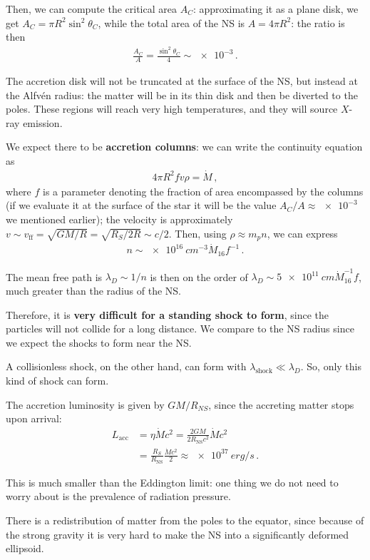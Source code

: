 \documentclass[main.tex]{subfiles}
\begin{document}
Then, we can compute the critical area \(A_C\): approximating it as a plane disk, we get \(A_C = \pi R^2 \sin^2 \theta _C\), while the total area of the NS is \(A = 4 \pi R^2\): the ratio is then 
%
\begin{align}
\frac{A_C}{A} = \frac{\sin^2 \theta _C}{4} \sim \num{e-3}
\,.
\end{align}

The accretion disk will not be truncated at the surface of the NS, but instead at the Alfvén radius: the matter will be in its thin disk and then be diverted to the poles. 
These regions will reach very high temperatures, and they will source \(X\)-ray emission.

We expect there to be \textbf{accretion columns}: we can write the continuity equation as 
%
\begin{align}
4 \pi R^2 f v \rho = \dot{M}
\,,
\end{align}
%
where \(f\) is a parameter denoting the fraction of area encompassed by the columns (if we evaluate it at the surface of the star it will be the value \(A_C / A \approx \num{e-3}\) we mentioned earlier); the velocity is approximately \(v \sim v _{\text{ff}} = \sqrt{GM/R} = \sqrt{R_S / 2R} \sim c/2\). 
Then, using \(\rho \approx m_p n\), we can express 
%
\begin{align}
n \sim \SI{e16}{cm^{-3}} \dot{M}_{16} f^{-1}
\,.
\end{align}

The mean free path is \(\lambda _D \sim 1/n\) is then on the order of \(\lambda _D \sim \SI{5e11}{cm} \dot{M}_{16}^{-1} f\), much greater than the radius of the NS. 

Therefore, it is \textbf{very difficult for a standing shock to form}, since the particles will not collide for a long distance. 
We compare to the NS radius since we expect the shocks to form near the NS. 

A collisionless shock, on the other hand, can form with \(\lambda _{\text{shock}} \ll \lambda _D\). 
So, only this kind of shock can form. 

The accretion luminosity is given by \(GM/R_{NS}\), since the accreting matter stops upon arrival:
%
\begin{align}
L _{\text{acc}} &= \eta \dot{M} c^2 = \frac{2GM}{2 R _{\text{NS}}c^2} \dot{M} c^2  \\
&= \frac{R_S}{R _{\text{NS}}} \frac{\dot{M}c^2}{2} \approx \SI{e37}{erg/s}
\,.
\end{align}

This is much smaller than the Eddington limit: one thing we do not need to worry about is the prevalence of radiation pressure. 

There is a redistribution of matter from the poles to the equator, since because of the strong gravity it is very hard to make the NS into a significantly deformed ellipsoid.
\end{document}
